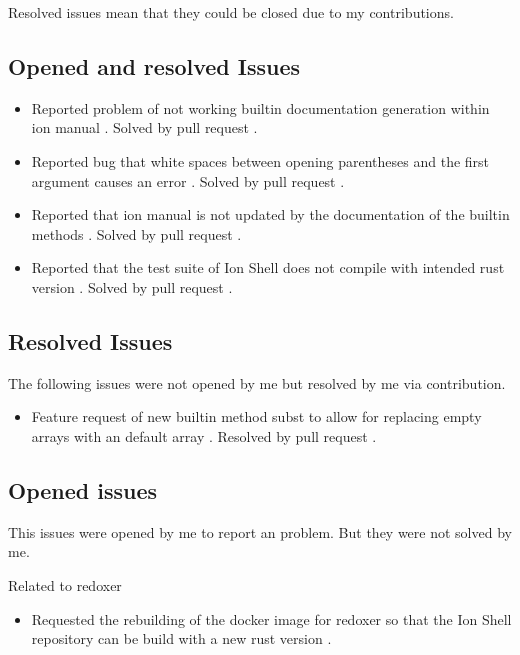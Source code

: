 Resolved issues mean that they could be closed due to my contributions.

\subsection{Opened and resolved Issues}

\begin{itemize}
	\item Reported problem of not working builtin documentation generation within ion manual \cite{issue_builtin_generation}. Solved by pull request \cite{pr_man_history_included_ion_manual}.
	\item Reported bug that white spaces between opening parentheses and the first argument causes an error \cite{issue_spaces_between_opening_parentheses}. Solved by pull request \cite{issue_spaces_between_opening_parentheses}.
	\item Reported that ion manual is not updated by the documentation of the builtin methods \cite{issue_ion_manual_not_updated}. Solved by pull request \cite{pr_subst_method}.
	\item Reported that the test suite of Ion Shell does not compile with intended rust version \cite{issue_bug_test_not_compile}. Solved by pull request \cite{pr_conf_partial_ci_fix}.
\end{itemize}

\subsection{Resolved Issues}

The following issues were not opened by me but resolved by me via contribution.

\begin{itemize}
	\item Feature request of new builtin method subst to allow for replacing empty arrays with an default array \cite{issue_subst_request}. Resolved by pull request \cite{pr_subst_method}.
\end{itemize}

\subsection{Opened issues}

This issues were opened by me to report an problem. But they were not solved by me.

Related to \gls{redoxer}

\begin{itemize}
	\item Requested the rebuilding of the docker image for \gls{redoxer} so that the Ion Shell repository can be build with a new rust version \cite{issue_request_new_docker_version}.
\end{itemize}

